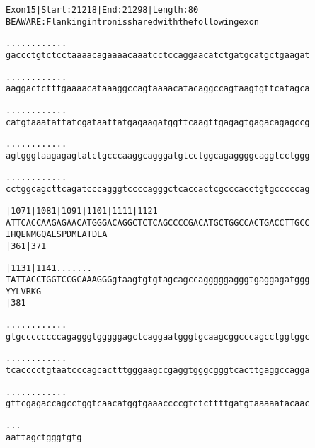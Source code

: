 \documentclass{article}
\begin{document}
\newpage
\begin{alltt}
Exon 15 | Start: 21218 | End: 21298 | Length: 80
BE AWARE: Flanking intron is shared with the following exon

.    .    .    .    .    .    .    .    .    .    .    .    
gaccctgtctcctaaaacagaaaacaaatcctccaggaacatctgatgcatgctgaagat

.    .    .    .    .    .    .    .    .    .    .    .    
aaggactctttgaaaacataaaggccagtaaaacatacaggccagtaagtgttcatagca

.    .    .    .    .    .    .    .    .    .    .    .    
catgtaaatattatcgataattatgagaagatggttcaagttgagagtgagacagagccg

.    .    .    .    .    .    .    .    .    .    .    .    
agtgggtaagagagtatctgcccaaggcagggatgtcctggcagaggggcaggtcctggg

.    .    .    .    .    .    .    .    .    .    .    .    
cctggcagcttcagatcccagggtccccagggctcaccactcgcccacctgtgcccccag

        |1071     |1081     |1091     |1101     |1111     |1121
ATTCACCAAGAGAACATGGGACAGGCTCTCAGCCCCGACATGCTGGCCACTGACCTTGCC
I  H  Q  E  N  M  G  Q  A  L  S  P  D  M  L  A  T  D  L  A  
                  |361                          |371        

        |1131     |1141  .    .    .    .    .    .    .    
TATTACCTGGTCCGCAAAGGGgtaagtgtgtagcagccagggggagggtgaggagatggg
Y  Y  L  V  R  K  G                                         
                  |381                                      

.    .    .    .    .    .    .    .    .    .    .    .    
gtgccccccccagagggtgggggagctcaggaatgggtgcaagcggcccagcctggtggc

.    .    .    .    .    .    .    .    .    .    .    .    
tcacccctgtaatcccagcactttgggaagccgaggtgggcgggtcacttgaggccagga

.    .    .    .    .    .    .    .    .    .    .    .    
gttcgagaccagcctggtcaacatggtgaaaccccgtctcttttgatgtaaaaatacaac

.    .    .    
aattagctgggtgtg
\end{alltt}
\newpage
\end{document}
